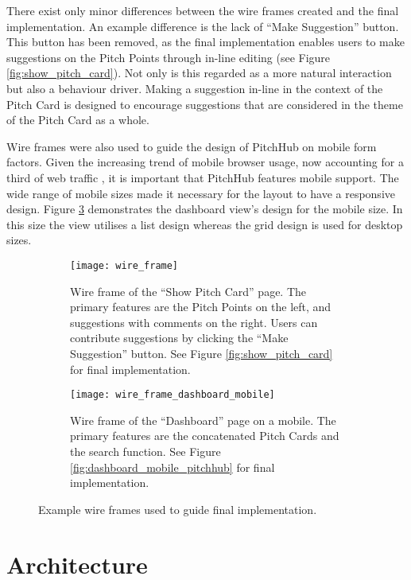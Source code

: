 There exist only minor differences between the wire frames created and the final implementation. An example difference is the lack of ``Make Suggestion'' button. This button has been removed, as the final implementation enables users to make suggestions on the Pitch Points through in-line editing (see Figure \ref{fig:show_pitch_card}). Not only is this regarded as a more natural interaction but also a behaviour driver. Making a suggestion in-line in the context of the Pitch Card is designed to encourage suggestions that are considered in the theme of the Pitch Card as a whole.

Wire frames were also used to guide the design of PitchHub on mobile form factors. Given the increasing trend of mobile browser usage, now accounting for a third of web traffic \cite{Mobile_rise:online}, it is important that PitchHub features mobile support. The wide range of mobile sizes made it necessary for the layout to have a responsive design. Figure \ref{fig:wire_frame_mobile} demonstrates the dashboard view's design for the mobile size. In this size the view utilises a list design whereas the grid design is used for desktop sizes.

\begin{figure}[ht]
  \begin{subfigure}[t]{.45\textwidth}
  \centering
    \texttt{[image: wire\_frame]}
    \caption{Wire frame of the ``Show Pitch Card'' page. The primary features are the Pitch Points on the left, and suggestions with comments on the right. Users can contribute suggestions by clicking the ``Make Suggestion'' button. See Figure \ref{fig:show_pitch_card} for final implementation.}
    \label{fig:wire_frame}
  \end{subfigure}\hfill
  \begin{subfigure}[t]{.45\textwidth}
  \centering
    \texttt{[image: wire\_frame\_dashboard\_mobile]}
    \caption{Wire frame of the ``Dashboard'' page on a mobile. The primary features are the concatenated Pitch Cards and the search function. See Figure \ref{fig:dashboard_mobile_pitchhub} for final implementation.}
    \label{fig:wire_frame_mobile}
  \end{subfigure}
  \caption{Example wire frames used to guide final implementation.}
\end{figure}

\section{Architecture}

